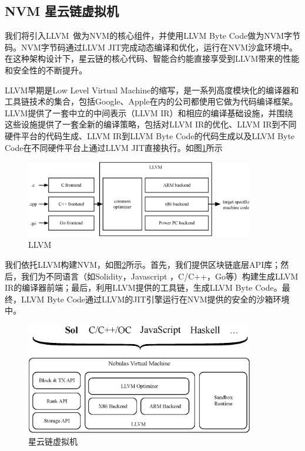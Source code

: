 \subsection{NVM 星云链虚拟机}
\label{sec:nvm}

我们将引入LLVM~\cite{llvm}做为NVM的核心组件，并使用LLVM Byte Code做为NVM字节码。NVM字节码通过LLVM JIT完成动态编译和优化，运行在NVM沙盒环境中。在这种架构设计下，星云链的核心代码、智能合约能直接享受到LLVM带来的性能和安全性的不断提升。

LLVM早期是Low Level Virtual
Machine的缩写，是一系列高度模块化的编译器和工具链技术的集合，包括Google、Apple在内的公司都使用它做为代码编译框架。LLVM提供了一套中立的中间表示（LLVM
IR）和相应的编译基础设施，并围绕这些设施提供了一套全新的编译策略，包括对LLVM
IR的优化、LLVM IR到不同硬件平台的代码生成、LLVM IR到LLVM Byte
Code的代码生成以及LLVM Byte Code在不同硬件平台上通过LLVM
JIT直接执行。如图\ref{fig:llvm}所示


\begin{figure}[h]
\centering
\includegraphics[width=10cm]{./figs/llvm}
\caption{LLVM}
\label{fig:llvm}
\end{figure}

我们依托LLVM构建NVM，如图\ref{fig:nvm}所示。首先，我们提供区块链底层API库；然后，我们为不同语言（如Solidity，Javascript
，C/C++，Go等）构建生成LLVM
IR的编译器前端；最后，利用LLVM提供的工具链，生成LLVM Byte Code。最终，LLVM Byte
Code通过LLVM的JIT引擎运行在NVM提供的安全的沙箱环境中。

\begin{figure}[h]
\centering
\includegraphics[width=10cm]{./figs/nvm}
\caption{星云链虚拟机}
\label{fig:nvm}
\end{figure}

